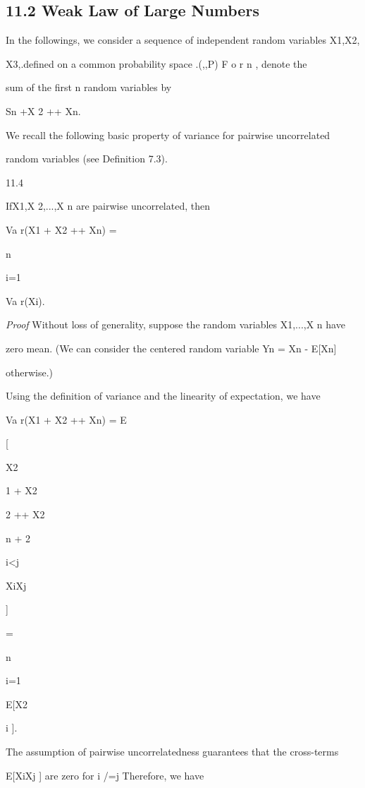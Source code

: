 \subsection*{11.2 Weak Law of Large Numbers}

In the followings, we consider a sequence of independent random variables X1,X2,

X3,.defined on a common probability space .(\Omega,,P) F o r n , denote the

sum of the first n random variables by

Sn  +X 2 +\cdot\cdot\cdot+ Xn.

We recall the following basic property of variance for pairwise uncorrelated

random variables (see Definition 7.3).

\begin{thmbox}{11.4}
\end{thmbox}

IfX1,X 2,...,X n are pairwise uncorrelated, then

Va r(X1 + X2 +\cdot\cdot\cdot+ Xn) =

n\sum

i=1

Va r(Xi).

\textit{Proof} Without loss of generality, suppose the random variables X1,...,X n have

zero mean. (We can consider the centered random variable Yn = Xn - E[Xn]

otherwise.)

Using the definition of variance and the linearity of expectation, we have

Va r(X1 + X2 +\cdot\cdot\cdot+ Xn) = E

[

X2

1 + X2

2 +\cdot\cdot\cdot+ X2

n + 2

\sum

i<j

XiXj

]

=

n\sum

i=1

E[X2

i ].

The assumption of pairwise uncorrelatedness guarantees that the cross-terms

E[XiXj ] are zero for i /=j Therefore, we have


